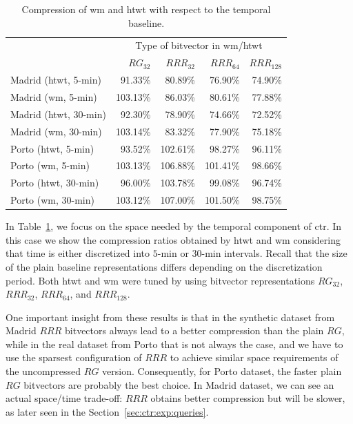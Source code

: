 	\begin{table}[ht]
	\begin{center}
	  \begin{tabular}{|l|*{4}{r}|}
	  \cline{2-5}
	  \multicolumn{1}{c|}{} & \multicolumn{4}{c|}{Type of bitvector in \gls{wm}/\gls{htwt}}\\

	  \multicolumn{1}{c|}{}   & $RG_{32}$& $RRR_{32}$& $RRR_{64}$& $RRR_{128}$\\
	  \hline                                             
	  Madrid (\gls{htwt}, 5-min) &  91.33\% &	 80.89\% &	 76.90\% & 	 74.90\% \\
	  Madrid (\gls{wm}, 5-min)   & 103.13\% &	 86.03\% &	 80.61\% & 	 77.88\% \\
	  Madrid (\gls{htwt}, 30-min)&  92.30\% &	 78.90\% &	 74.66\% &	 72.52\% \\
	  Madrid (\gls{wm}, 30-min)  & 103.14\% &	 83.32\% &	 77.90\% &	 75.18\% \\
	  \hline                  
	  Porto (\gls{htwt}, 5-min)  &  93.52\% &	102.61\% &	 98.27\% &	 96.11\% \\
	  Porto (\gls{wm}, 5-min)    & 103.13\% &	106.88\% &	101.41\% &	 98.66\% \\
	  Porto (\gls{htwt}, 30-min) &  96.00\% &	103.78\% &	 99.08\% &	 96.74\% \\
	  Porto (\gls{wm}, 30-min)   & 103.12\% &	107.00\% &	101.50\% &	 98.75\% \\

	  \hline
	  \cline{2-5}
	  \end{tabular}
	\caption{Compression of \acrshort{wm} and \acrshort{htwt} with respect to the temporal baseline.}
	\label{table:ctr:exp:space:wt}
	\end{center}
	\end{table}

	In Table~\ref{table:ctr:exp:space:wt}, we focus on the space needed by the temporal component of \gls{ctr}. 
	In this case we show the compression ratios obtained by \gls{htwt} and \gls{wm} 
	considering that time is either discretized into $5$-min or $30$-min intervals. Recall that the size of the 
	plain baseline representations differs depending on the discretization period. Both \gls{htwt} and \gls{wm} were tuned by
	using bitvector representations $RG_{32}$, $RRR_{32}$, $RRR_{64}$, and $ RRR_{128}$.

	One important insight from these results is that in the synthetic dataset from Madrid $RRR$ bitvectors always lead to a better compression than the plain $RG$, while in the real dataset from Porto that is not always the case, and we have to use the sparsest configuration of $RRR$ to achieve similar space requirements of the uncompressed $RG$ version. Consequently, for Porto dataset, the faster plain $RG$ bitvectors are probably the best choice. In Madrid dataset, we can see an actual space/time trade-off: $RRR$ obtains better compression but will be slower, as later seen in the Section~\ref{sec:ctr:exp:queries}.

